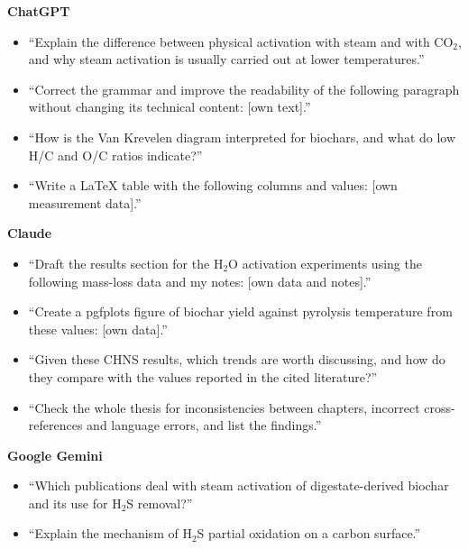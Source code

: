 \noindent\textbf{ChatGPT}
\begin{itemize}
	\setlength{\itemsep}{0.2em}
	\item ``Explain the difference between physical activation with steam and with
	CO$_2$, and why steam activation is usually carried out at lower
	temperatures.''
	\item ``Correct the grammar and improve the readability of the following
	paragraph without changing its technical content: [own text].''
	\item ``How is the Van Krevelen diagram interpreted for biochars, and what do
	low H/C and O/C ratios indicate?''
	\item ``Write a LaTeX table with the following columns and values: [own
	measurement data].''
\end{itemize}

\noindent\textbf{Claude}
\begin{itemize}
	\setlength{\itemsep}{0.2em}
	\item ``Draft the results section for the H$_2$O activation experiments using
	the following mass-loss data and my notes: [own data and notes].''
	\item ``Create a pgfplots figure of biochar yield against pyrolysis temperature
	from these values: [own data].''
	\item ``Given these CHNS results, which trends are worth discussing, and how do
	they compare with the values reported in the cited literature?''
	\item ``Check the whole thesis for inconsistencies between chapters, incorrect
	cross-references and language errors, and list the findings.''
\end{itemize}

\noindent\textbf{Google Gemini}
\begin{itemize}
	\setlength{\itemsep}{0.2em}
	\item ``Which publications deal with steam activation of digestate-derived
	biochar and its use for H$_2$S removal?''
	\item ``Explain the mechanism of H$_2$S partial oxidation on a carbon surface.''
\end{itemize}
